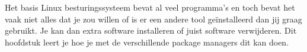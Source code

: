Het basis Linux besturingssysteem bevat al veel programma's en toch bevat het vaak niet alles dat je zou willen of is er een andere tool ge\"installeerd dan jij graag gebruikt. Je kan dan extra software installeren of juist software verwijderen. Dit hoofdstuk leert je hoe je met de verschillende package managers dit kan doen.
